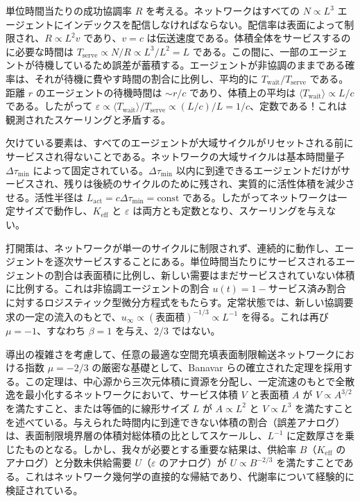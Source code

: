 \documentclass[11pt,a4paper]{article}
\begin{document}
	単位時間当たりの成功協調率 \(R\) を考える。ネットワークはすべての \(N \propto L^3\) エージェントにインデックスを配信しなければならない。配信率は表面によって制限され、\(R \propto L^2 v\) であり、\(v = c\) は伝送速度である。体積全体をサービスするのに必要な時間は \(T_{\mathrm{serve}} \propto N/R \propto L^3/L^2 = L\) である。この間に、一部のエージェントが待機しているため誤差が蓄積する。エージェントが非協調のままである確率は、それが待機に費やす時間の割合に比例し、平均的に \(T_{\mathrm{wait}}/T_{\mathrm{serve}}\) である。距離 \(r\) のエージェントの待機時間は \(\sim r/c\) であり、体積上の平均は \(\langle T_{\mathrm{wait}} \rangle \propto L/c\) である。したがって \(\varepsilon \propto \langle T_{\mathrm{wait}} \rangle/T_{\mathrm{serve}} \propto (L/c)/L = 1/c\)、定数である！これは観測されたスケーリングと矛盾する。
	
	欠けている要素は、すべてのエージェントが大域サイクルがリセットされる前にサービスされ得ないことである。ネットワークの大域サイクルは基本時間量子 \(\Delta\tau_{\min}\) によって固定されている。\(\Delta\tau_{\min}\) 以内に到達できるエージェントだけがサービスされ、残りは後続のサイクルのために残され、実質的に活性体積を減少させる。活性半径は \(L_{\mathrm{act}} = c\Delta\tau_{\min} = \text{const}\) である。したがってネットワークは一定サイズで動作し、\(K_{\mathrm{eff}}\) と \(\varepsilon\) は両方とも定数となり、スケーリングを与えない。
	
	打開策は、ネットワークが単一のサイクルに制限されず、連続的に動作し、エージェントを逐次サービスすることにある。単位時間当たりにサービスされるエージェントの割合は表面積に比例し、新しい需要はまだサービスされていない体積に比例する。これは非協調エージェントの割合 \(u(t) = 1 - \text{サービス済み割合}\) に対するロジスティック型微分方程式をもたらす。定常状態では、新しい協調要求の一定の流入のもとで、\(u_{\infty} \propto (\text{表面積})^{-1/3} \propto L^{-1}\) を得る。これは再び \(\mu = -1\)、すなわち \(\beta = 1\) を与え、\(2/3\) ではない。
	
	導出の複雑さを考慮して、任意の最適な空間充填表面制限輸送ネットワークにおける指数 \(\mu = -2/3\) の厳密な基礎として、Banavar らの確立された定理を採用する。この定理は、中心源から三次元体積に資源を分配し、一定流速のもとで全散逸を最小化するネットワークにおいて、サービス体積 \(V\) と表面積 \(A\) が \(V \propto A^{3/2}\) を満たすこと、または等価的に線形サイズ \(L\) が \(A \propto L^2\) と \(V \propto L^3\) を満たすことを述べている。与えられた時間内に到達できない体積の割合（誤差アナログ）は、表面制限境界層の体積対総体積の比としてスケールし、\(L^{-1}\) に定数厚さを乗じたものとなる。しかし、我々が必要とする重要な結果は、供給率 \(B\)（\(K_{\mathrm{eff}}\) のアナログ）と分数未供給需要 \(U\)（\(\varepsilon\) のアナログ）が \(U \propto B^{-2/3}\) を満たすことである。これはネットワーク幾何学の直接的な帰結であり、代謝率について経験的に検証されている。
	
\end{document}
